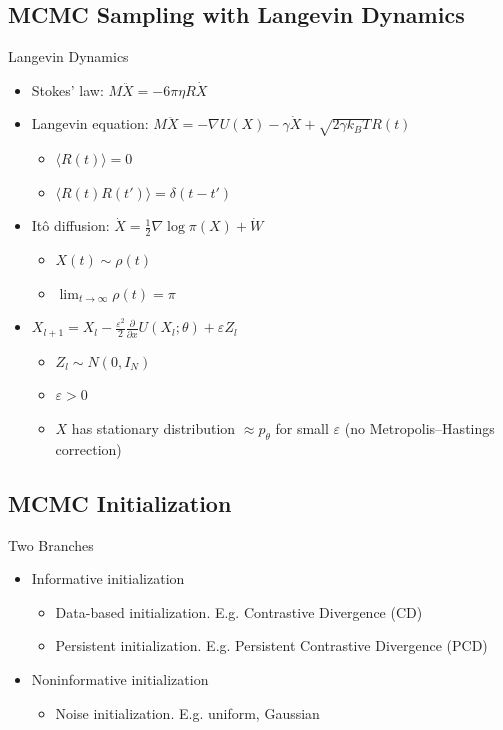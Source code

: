 \documentclass{beamer}
\begin{document}
\subsection{MCMC Sampling with Langevin Dynamics}
\begin{frame}{Langevin Dynamics}
\begin{itemize}
\item Stokes' law: $M{\ddot {X}}=-6\pi\eta R\dot{X}$
\item Langevin equation: $M{\ddot {X}}=-\nabla U(X)-\gamma {\dot {X}}+{\sqrt {2\gamma k_{B}T}}R(t)$
\begin{itemize}
\item $\langle R(t)\rangle=0$
\item $\langle R(t)R(t')\rangle=\delta(t-t')$
\end{itemize}
\item Itô diffusion: $\dot X=\frac{1}{2}\nabla\log\pi(X)+\dot W$
\begin{itemize}
\item $X(t)\sim\rho(t)$
\item $\lim_{t\to\infty}\rho(t)=\pi$
\end{itemize}
\item $X_{l+1}=X_l-\frac{\varepsilon^2}{2}\frac{\partial}{\partial x}U(X_l;\theta)+\varepsilon Z_l$
\begin{itemize}
\item $Z_l\sim N(0,I_N)$
\item $\varepsilon>0$
\item $X$ has stationary distribution $\approx p_\theta$ for small $\varepsilon$ (no Metropolis–Hastings correction)
\end{itemize}
\end{itemize}
\end{frame}

\subsection{MCMC Initialization}
\begin{frame}{Two Branches}
\begin{itemize}
\item Informative initialization
\begin{itemize}
\item Data-based initialization. E.g. Contrastive Divergence (CD)
\item Persistent initialization. E.g. Persistent Contrastive Divergence (PCD)
\end{itemize}
\item Noninformative initialization
\begin{itemize}
\item Noise initialization. E.g. uniform, Gaussian
\end{itemize}
\end{itemize}
\end{frame}
\end{document}
